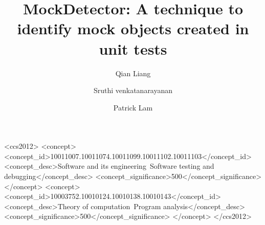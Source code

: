 \documentclass[sigconf,review,anonymous]{acmart}
\begin{document}
\title{MockDetector: A technique to identify mock objects created in unit tests}

\author{Qian Liang}
\author{Sruthi venkatanarayanan}
\author{Patrick Lam}



\begin{CCSXML}
<ccs2012>
<concept>
<concept_id>10011007.10011074.10011099.10011102.10011103</concept_id>
<concept_desc>Software and its engineering~Software testing and debugging</concept_desc>
<concept_significance>500</concept_significance>
</concept>
<concept>
<concept_id>10003752.10010124.10010138.10010143</concept_id>
<concept_desc>Theory of computation~Program analysis</concept_desc>
<concept_significance>500</concept_significance>
</concept>
</ccs2012>
\end{CCSXML}




\maketitle




\end{document}
